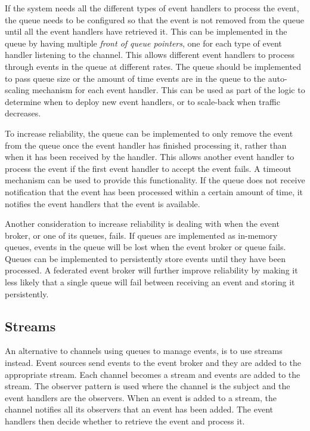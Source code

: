 If the system needs all the different types of event handlers to process the event,
the queue needs to be configured so that the event is not removed from the queue until all the event handlers have retrieved it.
This can be implemented in the queue by having multiple \emph{front of queue pointers}, one for each type of event handler listening to the channel.
This allows different event handlers to process through events in the queue at different rates.
The queue should be implemented to pass queue size or the amount of time events are in the queue to the auto-scaling mechanism for each event handler.
This can be used as part of the logic to determine when to deploy new event handlers, or to scale-back when traffic decreases.

To increase reliability, the queue can be implemented to only remove the event from the queue once the event handler has finished processing it,
rather than when it has been received by the handler.
This allows another event handler to process the event if the first event handler to accept the event fails.
A timeout mechanism can be used to provide this functionality.
If the queue does not receive notification that the event has been processed within a certain amount of time,
it notifies the event handlers that the event is available.

Another consideration to increase reliability is dealing with when the event broker, or one of its queues, fails.
If queues are implemented as in-memory queues, events in the queue will be lost when the event broker or queue fails.
Queues can be implemented to persistently store events until they have been processed.
A federated event broker will further improve reliability by making it less likely that a single queue will fail between receiving an event and storing it persistently.

\subsection{Streams}

An alternative to channels using queues to manage events, is to use streams instead.
Event sources send events to the event broker and they are added to the appropriate stream.
Each channel becomes a stream and events are added to the stream.
The observer pattern is used where the channel is the subject and the event handlers are the observers.
When an event is added to a stream, the channel notifies all its observers that an event has been added.
The event handlers then decide whether to retrieve the event and process it.


